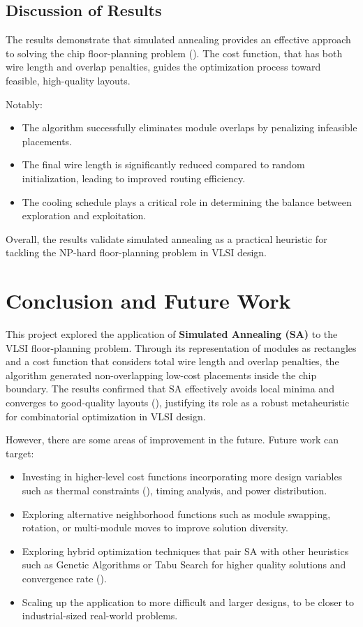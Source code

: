 \documentclass[9pt,a4paper,twoside]{rho-class/rho}
\begin{document}
\subsection{Discussion of Results}
The results demonstrate that simulated annealing provides an effective approach to solving the chip floor-planning problem (\cite{ictact2016,chen2011}). The cost function, that has both wire length and overlap penalties, guides the optimization process toward feasible, high-quality layouts.  

Notably:
\begin{itemize}
    \item The algorithm successfully eliminates module overlaps by penalizing infeasible placements.
    \item The final wire length is significantly reduced compared to random initialization, leading to improved routing efficiency.
    \item The cooling schedule plays a critical role in determining the balance between exploration and exploitation.
\end{itemize}

Overall, the results validate simulated annealing as a practical heuristic for tackling the NP-hard floor-planning problem in VLSI design.

\section{Conclusion and Future Work}
This project explored the application of \textbf{Simulated Annealing (SA)} to the VLSI floor-planning problem. Through its representation of modules as rectangles and a cost function that considers total wire length and overlap penalties, the algorithm generated non-overlapping low-cost placements inside the chip boundary. The results confirmed that SA effectively avoids local minima and converges to good-quality layouts (\cite{kirkpatrick1983,chen2011}), justifying its role as a robust metaheuristic for combinatorial optimization in VLSI design. 

However, there are some areas of improvement in the future. Future work can target: 
\begin{itemize}
    \item Investing in higher-level cost functions incorporating more design variables such as thermal constraints  (\cite{sun2024,parsac2024}), timing analysis, and power distribution.
    \item Exploring alternative neighborhood functions such as module swapping, rotation, or multi-module moves to improve solution diversity.
    \item Exploring hybrid optimization techniques that pair SA with other heuristics such as Genetic Algorithms or Tabu Search for higher quality solutions and convergence rate (\cite{banerjee2017,fang2009}).
    \item Scaling up the application to more difficult and larger designs, to be closer to industrial-sized real-world problems. 
\end{itemize}
\end{document}
